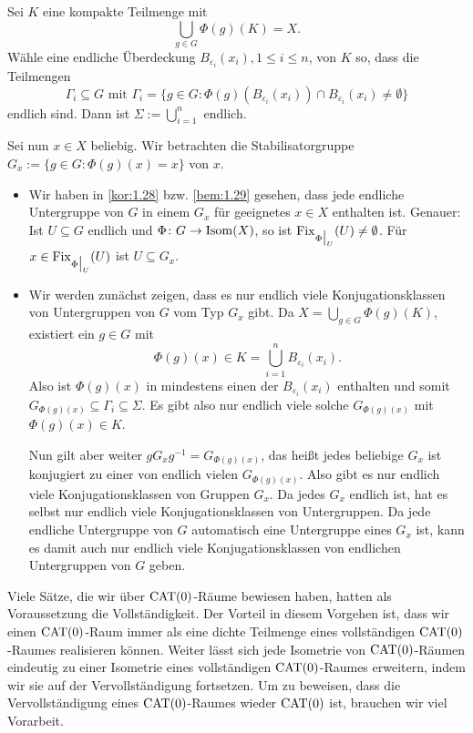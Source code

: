 \begin{beweis}
	Sei $K$ eine kompakte Teilmenge mit
	\[
		\bigcup_{g \in G} \Phi(g)(K) = X.
	\]
	Wähle eine endliche Überdeckung $B_{\varepsilon_i}(x_i), 1 \leq i \leq n$, von $K$ so, dass die Teilmengen
	\[
		\Gamma_i \subseteq G \text{ mit } \Gamma_i = \{g \in G : \Phi(g)(B_{\varepsilon_i}(x_i)) \cap B_{\varepsilon_i}(x_i) \neq \emptyset \}
	\]
	endlich sind.
	Dann ist $\Sigma := \bigcup_{i = 1}^n$ endlich.
	
	Sei nun $x \in X$ beliebig.
	Wir betrachten die Stabilisatorgruppe $G_x := \{g \in G : \Phi(g)(x) = x\}$ von $x$.
	\newpage
	\begin{itemize}
		\item Wir haben in \autoref{kor:1.28} bzw. \autoref{bem:1.29} gesehen, dass jede endliche Untergruppe von $G$ in einem $G_x$ für geeignetes $x \in X$ enthalten ist.
		Genauer:
		Ist $U \subseteq G$ endlich und $\Phi \colon G \rightarrow \operatorname{Isom}(X)$, so ist $\operatorname{Fix}_{\Phi \big|_U}(U) \neq \emptyset$. Für $x \in \operatorname{Fix}_{\Phi \big|_U}(U)$ ist $U \subseteq G_x$.
		\item Wir werden zunächst zeigen, dass es nur endlich viele Konjugationsklassen von Untergruppen von $G$ vom Typ $G_x$ gibt.
		Da $X = \bigcup_{g \in G} \Phi(g)(K)$, existiert ein $g \in G$ mit 
		\[
			\Phi(g)(x) \in K = \bigcup_{i=1}^n B_{\varepsilon_i}(x_i).
		\]
		Also ist $\Phi(g)(x)$ in mindestens einen der $B_{\varepsilon_i}(x_i)$ enthalten und somit $G_{\Phi(g)(x)} \subseteq \Gamma_i \subseteq \Sigma$. Es gibt also nur endlich viele solche $G_{\Phi(g)(x)}$ mit $\Phi(g)(x) \in K$.
		
		Nun gilt aber weiter $g G_x g^{-1} = G_{\Phi(g)(x)}$, das heißt jedes beliebige $G_x$ ist konjugiert zu einer von endlich vielen $G_{\Phi(g)(x)}$.
		Also gibt es nur endlich viele Konjugationsklassen von Gruppen $G_x$.
		Da jedes $G_x$ endlich ist, hat es selbst nur endlich viele Konjugationsklassen von Untergruppen.
		Da jede endliche Untergruppe von $G$ automatisch eine Untergruppe eines $G_x$ ist, kann es damit auch nur endlich viele Konjugationsklassen von endlichen Untergruppen von $G$ geben. \qedhere
	\end{itemize}
\end{beweis}

Viele Sätze, die wir über $\operatorname{CAT(0)}$-Räume bewiesen haben, hatten als Voraussetzung die Vollständigkeit.
Der Vorteil in diesem Vorgehen ist, dass wir einen $\operatorname{CAT(0)}$-Raum immer als eine dichte Teilmenge eines vollständigen $\operatorname{CAT(0)}$-Raumes realisieren können.
Weiter lässt sich jede Isometrie von $\operatorname{CAT(0)}$-Räumen eindeutig zu einer Isometrie eines vollständigen $\operatorname{CAT(0)}$-Raumes erweitern, indem wir sie auf der Vervollständigung fortsetzen.
Um zu beweisen, dass die Vervollständigung eines $\operatorname{CAT(0)}$-Raumes wieder $\operatorname{CAT(0)}$ ist, brauchen wir viel Vorarbeit.


